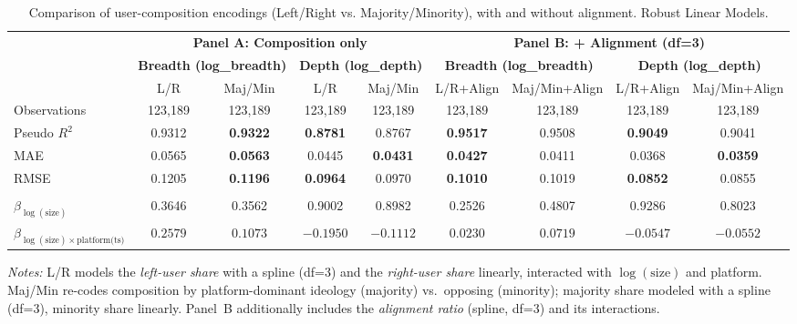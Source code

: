 \documentclass[letterpaper]{article} %
\begin{document}
\begin{table}[t]
\centering
\caption{Comparison of user-composition encodings (Left/Right vs. Majority/Minority), with and without alignment. Robust Linear Models.}
\label{tab:si_comp_encoding_rlm_full}
\scriptsize
\renewcommand{\arraystretch}{1.25}
\setlength{\tabcolsep}{3pt}

\begin{tabular}{lcccccccc}
\hline
& \multicolumn{4}{c}{\textbf{Panel A: Composition only}} & \multicolumn{4}{c}{\textbf{Panel B: + Alignment (df=3)}}\\
\cline{2-9}
& \multicolumn{2}{c}{\textbf{Breadth (log\_breadth)}} & \multicolumn{2}{c}{\textbf{Depth (log\_depth)}} & \multicolumn{2}{c}{\textbf{Breadth (log\_breadth)}} & \multicolumn{2}{c}{\textbf{Depth (log\_depth)}}\\
\cline{2-9}
& L/R & Maj/Min & L/R & Maj/Min & L/R+Align & Maj/Min+Align & L/R+Align & Maj/Min+Align \\
\hline
Observations & 123{,}189 & 123{,}189 & 123{,}189 & 123{,}189 & 123{,}189 & 123{,}189 & 123{,}189 & 123{,}189 \\
Pseudo $R^{2}$ & 0.9312 & \textbf{0.9322} & \textbf{0.8781} & 0.8767 & \textbf{0.9517} & 0.9508 & \textbf{0.9049} & 0.9041 \\
MAE & 0.0565 & \textbf{0.0563} & 0.0445 & \textbf{0.0431} & \textbf{0.0427} & 0.0411 & 0.0368 & \textbf{0.0359} \\
RMSE & 0.1205 & \textbf{0.1196} & \textbf{0.0964} & 0.0970 & \textbf{0.1010} & 0.1019 & \textbf{0.0852} & 0.0855 \\
\\
$\beta_{\log(\text{size})}$
& 0.3646 & 0.3562 & 0.9002 & 0.8982 & 0.2526 & 0.4807 & 0.9286 & 0.8023 \\
$\beta_{\log(\text{size})\times \text{platform(ts)}}$
& $0.2579$ & $0.1073$ & $-0.1950$ & $-0.1112$ & $0.0230$ & $0.0719$ & $-0.0547$ & $-0.0552$ \\
\hline
\end{tabular}

\vspace{0.75ex}
\footnotesize
\textit{Notes:}
L/R models the \emph{left-user share} with a spline (df=3) and the \emph{right-user share} linearly, interacted with $\log(\text{size})$ and platform.
Maj/Min re-codes composition by platform-dominant ideology (majority) vs.\ opposing (minority); majority share modeled with a spline (df=3), minority share linearly.
Panel~B additionally includes the \emph{alignment ratio} (spline, df=3) and its interactions.
\end{table}
\end{document}
